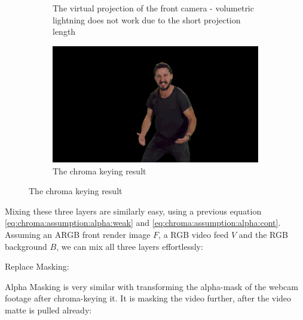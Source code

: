 \begin{figure}[htbp]
\begin{subfigure}[t]{.45\textwidth}
		\caption{The virtual projection of the front camera - volumetric 
		lightning does not work due to the short projection length}
		\label{fig:zsort:comparison:front}
	\end{subfigure}
	\begin{subfigure}[t]{.45\textwidth}
		\centering
		\includegraphics[width=\textwidth]{_raw_resources/composition/Composition-Chroma-Result.png}
		\caption{The chroma keying result}
	\end{subfigure}
\end{figure}

Mixing these three layers are similarly easy, using a previous equation 
\eqref{eq:chroma:assumption:alpha:weak} and 
\eqref{eq:chroma:assumption:alpha:cont}. Assuming an ARGB front render image 
$F$, a RGB video feed  $V$ and the RGB background $B$, 
we can mix all three layers effortlessly:

Replace Masking:







Alpha Masking is very similar with transforming the alpha-mask of the webcam 
footage after chroma-keying it. It is masking the video further, after the 
video matte is pulled already:


